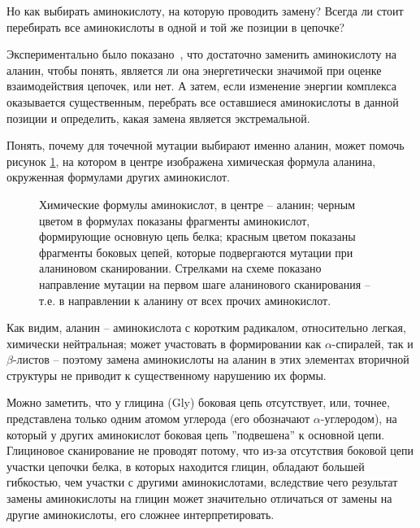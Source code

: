 Но как выбирать аминокислоту, на которую проводить замену? Всегда ли стоит перебирать все аминокислоты в одной и той же позиции в цепочке?

Экспериментально было показано~\cite{alascan2001}, что достаточно заменить аминокислоту на аланин, чтобы понять, является ли она энергетически значимой при оценке взаимодействия цепочек, или нет. А затем, если изменение энергии комплекса  оказывается существенным, перебрать все оставшиеся аминокислоты в данной позиции и определить, какая замена является экстремальной.

Понять, почему для точечной мутации выбирают именно аланин, может помочь рисунок \ref{fig:aminoacids}, на котором в центре изображена химическая формула аланина, окруженная формулами других аминокислот.

\begin{figure}
 \resizebox{!}{0.9\textwidth}{
 \ttfamily
 \footnotesize
 \aapicture
 }
\caption{\small{Химические формулы аминокислот, в центре -- аланин; черным цветом в формулах показаны фрагменты аминокислот, формирующие основную цепь белка; красным цветом показаны фрагменты боковых цепей, которые подвергаются мутации при аланиновом сканировании. Стрелками на схеме показано направление мутации на первом шаге аланинового сканирования -- т.е. в направлении к аланину от всех прочих аминокислот. }}
\label{fig:aminoacids}
\end{figure}

Как видим, аланин -- аминокислота с коротким радикалом, относительно легкая, химически нейтральная; может участовать в формировании как $\alpha$-спиралей, так и $\beta$-листов -- поэтому замена аминокислоты на аланин в этих элементах вторичной структуры не приводит к существенному нарушению их формы.

Можно заметить, что у глицина (Gly) боковая цепь отсутствует, или, точнее, представлена только одним атомом углерода (его обозначают  $\alpha$-углеродом), на который у других аминокислот боковая цепь ''подвешена'' к основной цепи. Глициновое сканирование не проводят потому, что из-за отсутствия боковой цепи участки цепочки белка, в которых находится глицин, обладают большей гибкостью, чем участки с другими аминокислотами, вследствие чего результат замены аминокислоты на глицин может значительно отличаться от замены на другие аминокислоты, его сложнее интерпретировать.

